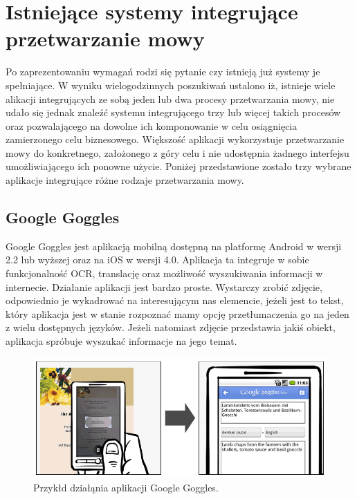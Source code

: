 


\ifpdf
    \graphicspath{{5/figures/PNG/}{5/figures/PDF/}{5/figures/}}
\else
    \graphicspath{{5/figures/EPS/}{5/figures/}}
\fi

\chapter{Istniejące systemy integrujące przetwarzanie mowy} %
Po zaprezentowaniu wymagań rodzi się pytanie czy istnieją już systemy je spełniające. W wyniku wielogodzinnych poszukiwań ustalono iż, istnieje wiele alikacji integrujących ze sobą jeden lub dwa procesy przetwarzania mowy, nie udało się jednak znaleźć systemu integrującego trzy lub więcej takich procesów oraz pozwalającego na dowolne ich komponowanie w celu osiągnięcia zamierzonego celu biznesowego. Większość aplikacji wykorzystuje przetwarzanie mowy do konkretnego, założonego z góry celu i nie udostępnia żadnego interfejsu umożliwiającego ich ponowne użycie.  Poniżej przedstawione zostało trzy wybrane aplikacje integrujące różne rodzaje przetwarzania mowy.

\section {Google Goggles}

Google Goggles\cite{googlegoggles} jest aplikacją mobilną dostępną na platformę Android w wersji 2.2 lub wyższej oraz na iOS w wersji 4.0. Aplikacja ta integruje w sobie funkcjonalność OCR, translację oraz możliwość wyszukiwania informacji w internecie. Działanie aplikacji jest bardzo proste. Wystarczy zrobić zdjęcie, odpowiednio je wykadrować na interesującym nas elemencie, jeżeli jest to tekst, który aplikacja jest w stanie rozpoznać mamy opcję przetłumaczenia go na jeden z wielu dostępnych języków. Jeżeli natomiast zdjęcie przedstawia jakiś obiekt, aplikacja spróbuje wyszukać informacje na jego temat.	

\begin{figure}[!h]
	\centering
	\includegraphics[scale=0.5]{google_goggles.png}
	\caption{Przykłd działąnia aplikacji Google Goggles\cite{googlegoggles}. }\label{fig:google_goggles}
\end{figure}

